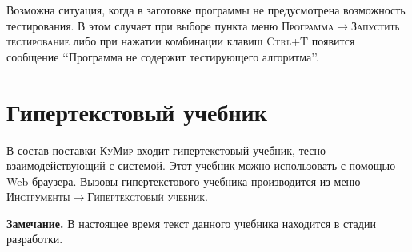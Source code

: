 Возможна ситуация, когда в заготовке программы не предусмотрена возможность тестирования. В этом случает при выборе пункта 
меню  \textsc{Программа}$\rightarrow$\textsc{Запустить} \textsc{тестирование} либо 
при нажатии комбинации клавиш \textsc{Ctrl+T} появится сообщение \lq\lq Программа не содержит тестирующего алгоритма\rq\rq.

\section{Гипертекстовый учебник}

В состав поставки \textsc{КуМир} входит гипертекстовый учебник, тесно взаимодействующий с системой. Этот учебник можно использовать с
помощью Web-браузера. Вызовы гипертекстового учебника производится из меню \textsc{Инструменты}$\rightarrow$\textsc{Гипертекстовый учебник}.

\textbf{Замечание.} В настоящее время текст данного учебника находится в стадии разработки.
